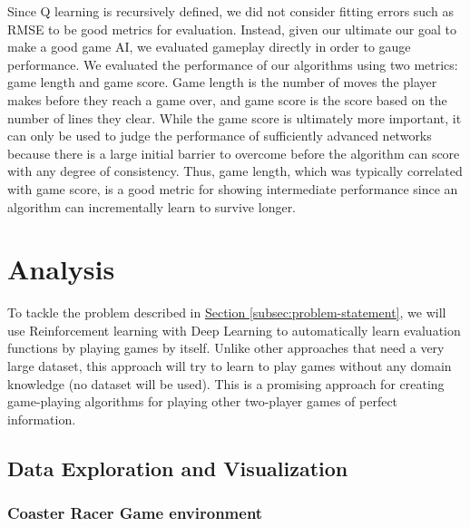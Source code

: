\documentclass[a4paper]{article}
\begin{document}
Since Q learning is recursively defined, we did not consider fitting errors such as RMSE to be good metrics for evaluation. Instead, given our ultimate our goal to make a good game AI, we evaluated gameplay directly in order to gauge performance. We evaluated the performance of our algorithms using two metrics: game length and game score. Game length is the number of moves the player makes before they reach a game over, and game score is the score based on the number of lines they clear. While the game score is ultimately more important, it can only be used to judge the performance of sufficiently advanced networks because there is a large initial barrier to overcome before the algorithm can score with any degree of consistency. Thus, game length, which was typically correlated with game score, is a good metric for showing intermediate performance since an algorithm can incrementally learn to survive longer.
      


\section{Analysis}

To tackle the problem described in \hyperref[subsec:problem-statement]{Section \ref*{subsec:problem-statement}}, we will use Reinforcement learning with Deep Learning to automatically learn evaluation functions by playing games by itself. Unlike other approaches that need a very large dataset, this approach will try to learn to play games without any domain knowledge (no dataset will be used). This is a promising approach for creating game-playing algorithms for playing other two-player games of perfect information.

\subsection{Data Exploration and Visualization}

\subsubsection{Coaster Racer Game environment}
\end{document}
